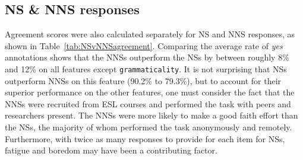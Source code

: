\documentclass[11pt,a4paper]{article}
\newcommand{\feat}[1]{\texttt{#1}}
\begin{document}
\subsection{NS \& NNS responses}
\label{NSandNNSagreement}
Agreement scores were also calculated separately for NS and NNS responses, as shown in Table~\ref{tab:NSvNNSagreement}. Comparing the average rate of \textit{yes} annotations shows that the NNSs outperform the NSs by between roughly 8\% and 12\% on all features except \feat{grammaticality}. It is not surprising that NSs outperform NNSs on this feature (90.2\% to 79.3\%), but to account for their superior performance on the other features, one must consider the fact that the NNSs were recruited from ESL courses and performed the task with peers and researchers present. The NNSs were more likely to make a good faith effort than the NSs, the majority of whom performed the task anonymously and remotely. Furthermore, 
with twice as many responses to provide for each item for NSs, fatigue and boredom may have been a contributing factor.
\end{document}
